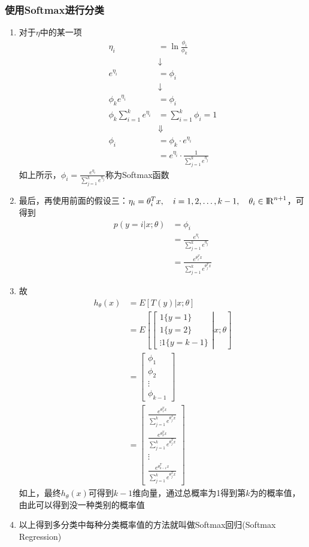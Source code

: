 \subsubsection{使用Softmax进行分类}
\begin{enumerate}
	\item 对于$\eta$中的某一项
	\begin{align}
		\eta_i &= \ln{\frac{\phi_i}{\phi_k}} \\
		&\downarrow \\
		e^{\eta_i} &= \phi_i \\
		&\downarrow \\
		\phi_k e^{\eta_i} &= \phi_i \\
		\phi_k\sum_{i=1}^{k}e^{\eta_i} &= \sum_{i=1}^{k}\phi_i = 1 \\
		&\Downarrow \\
		\phi_i &= \phi_k\cdot e^{\eta_i} \\
		&= e^{\eta_i} \cdot \frac{1}{\sum_{j=1}^{k}e^{\eta_j}}
	\end{align}
	如上所示，$\phi_i = \frac{e^{\eta_i}}{\sum_{j=1}^{k}e^{\eta_j}}$称为Softmax函数
	\item 最后，再使用前面的假设三：$\eta_i = \theta_i^Tx, \quad i=1,2, \dots, k-1, \quad \theta_i \in {\rm I\!R}^{n+1}$，可得到
	\begin{align}
		p(y=i|x; \theta) &= \phi_i \\
		&= \frac{e^{\eta_i}}{\sum_{j=1}^{k}e^{\eta_j}} \\ 
		&= \frac{e^{\theta_i^Tx}}{\sum_{j=1}^{k}e^{\theta_j^Tx}}
	\end{align}
	\item 故
	\begin{align}
		h_\theta(x) &= E\left[T(y)|x;\theta\right] \\
		&= E\left[\left[\begin{matrix} 1\{y=1\} \\ 1\{y=2\} \\ \vdots 1\{y=k-1\} \end{matrix}\right|x;\theta\right] \\
		&= \left[\begin{matrix}\phi_1 \\ \phi_2 \\ \vdots \\ \phi_{k-1} \end{matrix}\right] \\ 
		&= \left[\begin{matrix}
		\frac{e^{\theta_1^Tx}}{\sum_{j=1}^{k}e^{\theta_j^Tx}} \\
		\frac{e^{\theta_2^Tx}}{\sum_{j=1}^{k}e^{\theta_j^Tx}} \\
		\vdots \\
		\frac{e^{\theta_{k-1}^Tx}}{\sum_{j=1}^{k}e^{\theta_j^Tx}}
		\end{matrix}\right]
	\end{align}
	如上，最终$h_\theta(x)$可得到$k-1$维向量，通过总概率为1得到第$k$为的概率值，由此可以得到没一种类别的概率值
	\item 以上得到多分类中每种分类概率值的方法就叫做Softmax回归(Softmax Regression)
\end{enumerate}


